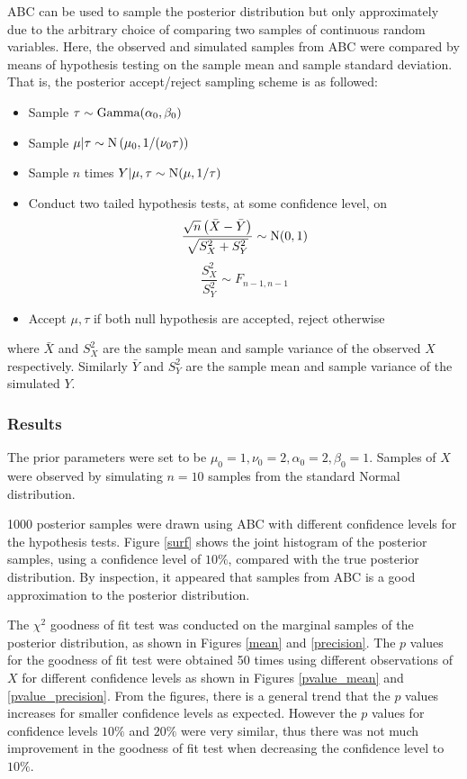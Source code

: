 \documentclass[a4paper,10pt]{article}
\begin{document}
ABC can be used to sample the posterior distribution but only approximately due to the arbitrary choice of comparing two samples of continuous random variables. Here, the observed and simulated samples from ABC were compared by means of hypothesis testing on the sample mean and sample standard deviation. That is, the posterior accept/reject sampling scheme is as followed:
\begin{itemize}
	\item Sample $\tau\sim\textup{Gamma}(\alpha_0,\beta_0)$
	\item Sample $\mu|\tau\sim\textup{N}\left(\mu_0,1/(\nu_0\tau)\right)$
	\item Sample $n$ times $Y|\mu,\tau\sim\textup{N}(\mu,1/\tau)$
	\item Conduct two tailed hypothesis tests, at some confidence level, on
	\begin{equation}
	\dfrac{\sqrt{n}\left(\bar{X}-\bar{Y}\right)}{\sqrt{S_X^2+S_Y^2}}\sim\textup{N}(0,1)
	\end{equation}
	\begin{equation}
	\dfrac{S_X^2}{S_Y^2}\sim F_{n-1,n-1}
	\end{equation}
	\item Accept $\mu,\tau$ if both null hypothesis are accepted, reject otherwise
\end{itemize}
where $\bar{X}$ and $S_X^2$ are the sample mean and sample variance of the observed $X$ respectively. Similarly $\bar{Y}$ and $S_Y^2$ are the sample mean and sample variance of the simulated $Y$.

\subsubsection{Results}
The prior parameters were set to be $\mu_0=1,\nu_0=2,\alpha_0=2,\beta_0=1$. Samples of $X$ were observed by simulating $n=10$ samples from the standard Normal distribution.

1000 posterior samples were drawn using ABC with different confidence levels for the hypothesis tests. Figure \ref{surf} shows the joint histogram of the posterior samples, using a confidence level of $10\%$, compared with the true posterior distribution. By inspection, it appeared that samples from ABC is a good approximation to the posterior distribution.

The $\chi^2$ goodness of fit test was conducted on the marginal samples of the posterior distribution, as shown in Figures \ref{mean} and \ref{precision}. The $p$ values for the goodness of fit test were obtained 50 times using different observations of $X$ for different confidence levels as shown in Figures \ref{pvalue_mean} and \ref{pvalue_precision}. From the figures, there is a general trend that the $p$ values increases for smaller confidence levels as expected. However the $p$ values for confidence levels $10\%$ and $20\%$ were very similar, thus there was not much improvement in the goodness of fit test when decreasing the confidence level to $10\%.$
\end{document}
